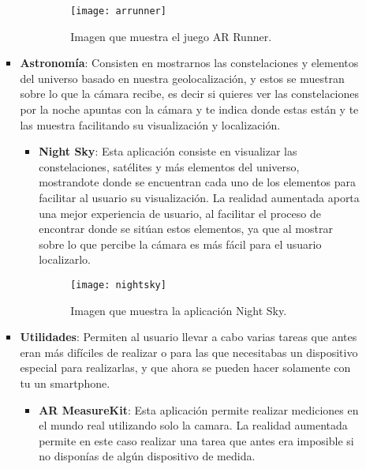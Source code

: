 \begin{itemize}
\begin{itemize}
\begin{itemize}
\begin{itemize}
    \begin{figure}[h]
      \centering
      \texttt{[image: arrunner]}
      \caption{Imagen que muestra el juego AR Runner.\protect\footnotemark}
      \label{figura-ar-runner}
    \end{figure}

  \end{itemize}

  \item \textbf{Astronomía}: Consisten en mostrarnos las constelaciones y elementos del universo basado en nuestra geolocalización, y estos se muestran sobre lo que la cámara recibe, es decir si quieres ver las constelaciones por la noche apuntas con la cámara y te indica donde estas están y te las muestra facilitando su visualización y localización.

  \begin{itemize}
    \item \textbf{Night Sky}: Esta aplicación consiste en visualizar las constelaciones, satélites y más elementos del universo, mostrandote donde se encuentran cada uno de los elementos para facilitar al usuario su visualización. La realidad aumentada aporta una mejor experiencia de usuario, al facilitar el proceso de encontrar donde se sitúan estos elementos, ya que al mostrar sobre lo que percibe la cámara es más fácil para el usuario localizarlo.

    \begin{figure}[h]
      \centering
      \texttt{[image: nightsky]}
      \caption{Imagen que muestra la aplicación Night Sky.\protect\footnotemark}
      \label{figura-night-sky}
    \end{figure}

  \end{itemize}

  \item \textbf{Utilidades}: Permiten al usuario llevar a cabo varias tareas que antes eran más difíciles de realizar o para las que necesitabas un dispositivo especial para realizarlas, y que ahora se pueden hacer solamente con tu un smartphone.

  \begin{itemize}
    \item \textbf{AR MeasureKit}: Esta aplicación permite realizar mediciones en el mundo real utilizando solo la camara. La realidad aumentada permite en este caso realizar una tarea que antes era imposible si no disponías de algún dispositivo de medida.


\end{itemize}
\end{itemize}
\end{itemize}
\end{itemize}
